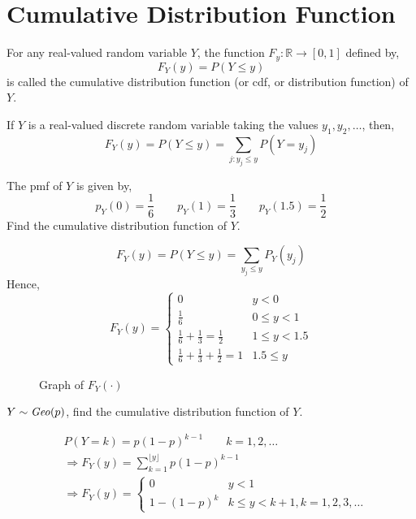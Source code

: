 \section{Cumulative Distribution Function}
\begin{definition}
For any real-valued random variable $Y$, the function $F_y : \mathbb{R}
\rightarrow [0, 1]$ defined by,
\[
	F_Y(y) = P(Y \leq y)
\]
is called the cumulative distribution function (or cdf, or distribution
function) of $Y$.
\end{definition}
\begin{example}
If $Y$ is a real-valued discrete random variable taking the values $y_1, y_2,
\dots$, then,
\[
    F_Y(y) = P(Y \leq y) 
           = \sum_{j : y_j \leq y} P(Y = y_j)
\]
\end{example}
\begin{example}
The pmf of $Y$ is given by,
\[
    p_Y(0) = \frac{1}{6} \qquad
    p_Y(1) = \frac{1}{3} \qquad
    p_Y(1.5) = \frac{1}{2}
\]
Find the cumulative distribution function of $Y$.
\end{example}
\begin{solution}
\[
    F_Y(y) = P(Y \leq y)
           = \sum_{y_j \leq y} P_Y(y_j)
\]
Hence,
\[
    F_Y(y) = \begin{cases}
        0                                              & y < 0          \\
        \frac{1}{6}                                    & 0 \leq y < 1   \\
        \frac{1}{6}+\frac{1}{3} =\frac{1}{2}           & 1 \leq y < 1.5 \\
        \frac{1}{6}+\frac{1}{3}+\frac{1}{2} = 1        & 1.5 \leq y
    \end{cases}
\]
\begin{figure}[H]
    \centering
    
    \caption{Graph of $F_Y(\cdot)$}
\end{figure}
\end{solution}
\begin{example}
$Y \sim \text{\emph{Geo}}(p)$, find the cumulative distribution function of $Y$. 
\end{example}
\begin{solution}
\begin{align*}
    & P(Y = k) = p(1 - p)^{k - 1} \qquad k = 1, 2, \dots                     \\
    & \Rightarrow F_Y(y) = \sum_{k = 1}^{\lfloor y \rfloor} p (1 - p)^{k - 1}\\
    & \Rightarrow F_Y(y) = \begin{cases}
        0                  & y < 1                                           \\
        1 - (1 - p)^k      & k \leq y < k + 1, k = 1, 2, 3, \dots
    \end{cases}
\end{align*}
\end{solution}
